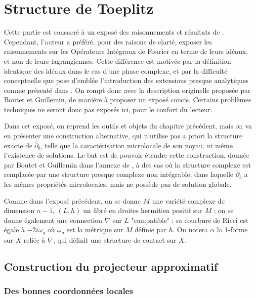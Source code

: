 \chapter{Structure de Toeplitz}

Cette partie est consacré à un exposé des raisonnements et résultats de \cite{Shiffman2002}. Cependant, l'auteur a préféré, pour des raisons de clarté, exposer les raisonnements sur les Opérateurs Intégraux de Fourier en terme de leurs idéaux, et non de leurs lagrangiennes. Cette différence est motivée par la définition identique des idéaux dans le cas d'une phase complexe, et par la difficulté conceptuelle que pose d'emblée l'introduction des extensions presque analytiques comme présenté dans \cite{melin1975fourier}. On rompt donc avec la description originelle proposée par Boutet et Guillemin, de manière à proposer un exposé concis. Certains problèmes techniques ne seront donc pas exposés ici, pour le confort du lecteur.

Dans cet exposé, on reprend les outils et objets du chapitre précédent, mais on va en présenter une construction alternative, qui n'utilise pas a priori la structure exacte de $\overline{\partial}_b$, telle que la caractérisation microlocale de son noyau, ni même l'existence de solutions. Le but est de pouvoir étendre cette construction, donnée par Boutet et Guillemin dans l'annexe de \cite{BoutetdeMonvel1981}, à des cas où la structure complexe est remplacée par une structure presque complexe non intégrable, dans laquelle $\overline{\partial}_b$ a les mêmes propriétés microlocales, mais ne possède pas de solution globale.

Comme dans l'exposé précédent, on se donne $M$ une variété complexe de dimension $n-1$, $(L,h)$ un fibré en droites hermitien positif sur $M$ ; on se donne également une connection $\nabla$ sur $L$ "compatible" : sa courbure de Ricci est égale à $-2i\omega_g$ où $\omega_g$ est la métrique sur $M$ définie par $h$. On notera $\alpha$ la 1-forme sur $X$ reliée à $\nabla$, qui définit une structure de contact sur $X$.

\section{Construction du projecteur approximatif}

\subsection{Des bonnes coordonnées locales}

